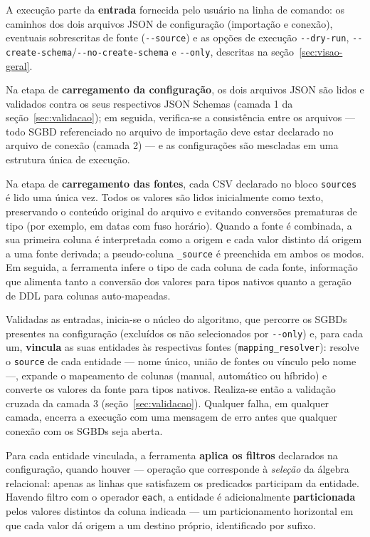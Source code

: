 A execução parte da \textbf{entrada} fornecida pelo usuário na linha de comando: os
caminhos dos dois arquivos JSON de configuração (importação e conexão), eventuais
sobrescritas de fonte (\texttt{-{}-source}) e as opções de execução
\texttt{-{}-dry-run}, \texttt{-{}-create-schema}/\texttt{-{}-no-create-schema} e
\texttt{-{}-only}, descritas na seção~\ref{sec:visao-geral}.

Na etapa de \textbf{carregamento da configuração}, os dois arquivos JSON são lidos e
validados contra os seus respectivos JSON Schemas (camada 1 da
seção~\ref{sec:validacao}); em seguida, verifica-se a consistência entre os arquivos ---
todo SGBD referenciado no arquivo de importação deve estar declarado no
arquivo de conexão (camada 2) --- e as configurações são mescladas em uma estrutura única
de execução.

Na etapa de \textbf{carregamento das fontes}, cada CSV declarado no bloco
\texttt{sources} é lido uma única vez. Todos os valores são lidos inicialmente como
texto, preservando o conteúdo original do arquivo e evitando conversões prematuras de
tipo (por exemplo, em datas com fuso horário). Quando a fonte é combinada, a sua primeira
coluna é interpretada como a origem e cada valor distinto dá origem a uma fonte derivada;
a pseudo-coluna \texttt{\_source} é preenchida em ambos os modos. Em seguida, a ferramenta
infere o tipo de cada coluna de cada fonte, informação que alimenta tanto a conversão dos
valores para tipos nativos quanto a geração de DDL para colunas auto-mapeadas.

Validadas as entradas, inicia-se o núcleo do algoritmo, que percorre os SGBDs presentes
na configuração (excluídos os não selecionados por \texttt{-{}-only}) e, para cada um,
\textbf{vincula} as suas entidades às respectivas fontes (\texttt{mapping\_resolver}):
resolve o \texttt{source} de cada entidade --- nome único, união de fontes ou vínculo pelo
nome ---, expande o mapeamento de colunas (manual, automático ou híbrido) e converte os
valores da fonte para tipos nativos. Realiza-se então a validação cruzada da camada 3
(seção~\ref{sec:validacao}). Qualquer falha, em qualquer camada, encerra a execução com
uma mensagem de erro antes que qualquer conexão com os SGBDs seja aberta.

Para cada entidade vinculada, a ferramenta \textbf{aplica os filtros} declarados na
configuração, quando houver --- operação que corresponde à \textit{seleção} da álgebra
relacional: apenas as linhas que satisfazem os predicados participam da entidade. Havendo
filtro com o operador \texttt{each}, a entidade é adicionalmente \textbf{particionada}
pelos valores distintos da coluna indicada --- um particionamento horizontal em que cada
valor dá origem a um destino próprio, identificado por sufixo.

